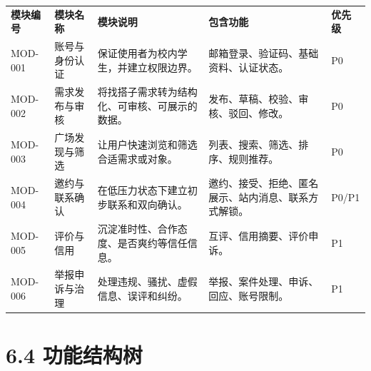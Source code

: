 {\def\LTcaptype{none} %
\begin{xltabular}{\textwidth}{@{}>{\centering\arraybackslash}X>{\centering\arraybackslash}X>{\centering\arraybackslash}X>{\centering\arraybackslash}X>{\centering\arraybackslash}X@{}}
\toprule\noalign{}
\endhead
\bottomrule\noalign{}
\endlastfoot
\textbf{模块编号} & \textbf{模块名称} & \textbf{模块说明} &
\textbf{包含功能} & \textbf{优先级} \\
MOD-001 & 账号与身份认证 & 保证使用者为校内学生，并建立权限边界。 &
邮箱登录、验证码、基础资料、认证状态。 & P0 \\
MOD-002 & 需求发布与审核 &
将找搭子需求转为结构化、可审核、可展示的数据。 &
发布、草稿、校验、审核、驳回、修改。 & P0 \\
MOD-003 & 广场发现与筛选 & 让用户快速浏览和筛选合适需求或对象。 &
列表、搜索、筛选、排序、规则推荐。 & P0 \\
MOD-004 & 邀约与联系确认 & 在低压力状态下建立初步联系和双向确认。 &
邀约、接受、拒绝、匿名展示、站内消息、联系方式解锁。 & P0/P1 \\
MOD-005 & 评价与信用 & 沉淀准时性、合作态度、是否爽约等信任信息。 &
互评、信用摘要、评价申诉。 & P1 \\
MOD-006 & 举报申诉与治理 & 处理违规、骚扰、虚假信息、误评和纠纷。 &
举报、案件处理、申诉、回应、账号限制。 & P1 \\
\end{xltabular}
}

\section{6.4 功能结构树}\label{ux529fux80fdux7ed3ux6784ux6811}

